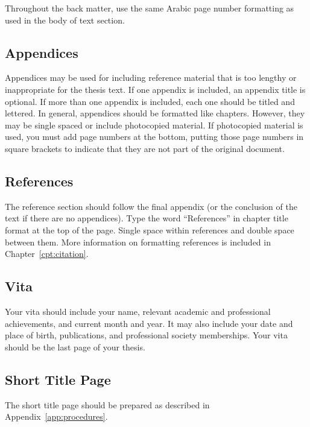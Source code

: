 Throughout the back matter, use the same Arabic page number formatting as used
in the body of text section.

\subsection{Appendices}

Appendices may be used for including reference material that is too lengthy or
inappropriate for the thesis text.  If one appendix is included, an appendix
title is optional.  If more than one appendix is included, each one should be
titled and lettered.  In general, appendices should be formatted like chapters.
However, they may be single spaced or include photocopied material.  If
photocopied material is used, you must add page numbers at the bottom, putting
those page numbers in square brackets to indicate that they are not part of the
original document.

\subsection{References}

The reference section should follow the final appendix (or the conclusion of
the text if there are no appendices).  Type the word ``References'' in chapter
title format at the top of the page.  Single space within references and double
space between them.  More information on formatting references is included in
Chapter~\ref{cpt:citation}.

\subsection{Vita}

Your vita should include your name, relevant academic and professional
achievements, and current month and year.  It may also include your date and
place of birth, publications, and professional society memberships.  Your vita
should be the last page of your thesis.

\subsection{Short Title Page}

The short title page should be prepared as described in
Appendix~\ref{app:procedures}.

